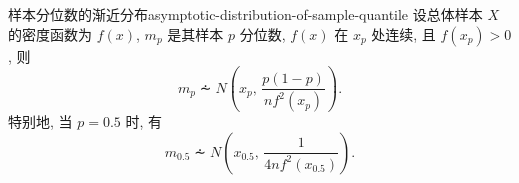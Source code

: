 \begin{newtheorembox}{样本分位数的渐近分布}{asymptotic-distribution-of-sample-quantile}
	设总体样本 $X$ 的密度函数为 $f(x)$, $m_p$ 是其样本 $p$ 分位数, $f(x)$ 在 $x_p$ 处连续, 且 $f(x_p)>0$, 则
	\[
		m_p\dotsim N\left(x_p,\,\frac{p(1-p)}{nf^2(x_p)}\right).
	\]
	特别地, 当 $p=0.5$ 时, 有
	\[
		m_{0.5}\dotsim N\left(x_{0.5},\,\frac{1}{4nf^2(x_{0.5})}\right).
	\]
\end{newtheorembox}

\newcommand{\GaDistri}[2]{\mathop{\mathrm{Ga}}\nolimits\left(#1,\,#2\right)}


\newcommand{\gammaFunc}[1]{%
  \pgfmathifisint{#1}{%
    \pgfmathparse{factorial(#1-1)}%
  }{%
		\pgfmathparse{#1-0.5}%
    \pgfmathparse{((2*\pgfmathresult)!)/(4^(\pgfmathresult)*factorial(\pgfmathresult))*sqrt(pi)}%
  }
}


